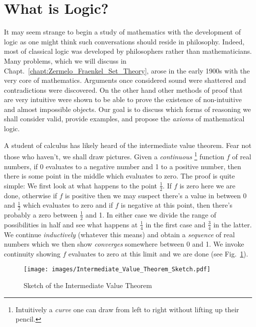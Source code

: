 \section{What is Logic?}
    It may seem strange to begin a study of mathematics with the development of
    logic as one might think such conversations should reside in philosophy.
    Indeed, most of classical logic was developed by philosophers rather than
    mathematicians. Many problems, which we will discuss in
    Chapt.~\ref{chapt:Zermelo_Fraenkel_Set_Theory}, arose in the early 1900s
    with the very core of mathematics. Arguments once considered sound were
    shattered and contradictions were discovered. On the other hand
    other methods of proof that are very intuitive were shown to be able to
    prove the existence of non-intuitive and almost impossible objects. Our goal
    is to discuss which forms of reasoning we shall consider valid, provide
    examples, and propose the \textit{axioms} of mathematical logic.
    \begin{example}
        \label{ex:Logic_IVP}%
        A student of calculus has likely heard of the intermediate value
        theorem. Fear not those who haven't,
        we shall draw pictures. Given a \textit{continuous}%
        \footnote{%
            Intuitively a \textit{curve} one can draw from left to right without
            lifting up their pencil.%
        }
        function $f$ of real numbers, if 0 evaluates to a negative number
        and 1 to a positive number, then there is some point in the middle which
        evaluates to zero. The proof is quite simple: We first look at what
        happens to the point $\frac{1}{2}$. If $f$ is zero here we are done,
        otherwise if $f$ is positive then we may suspect there's a value in
        between 0 and $\frac{1}{2}$ which evaluates to zero and if $f$ is
        negative at this point, then there's probably a zero between
        $\frac{1}{2}$ and 1. In either case we divide the range of possibilities
        in half and see what happens at $\frac{1}{4}$ in the first case and
        $\frac{3}{4}$ in the latter. We continue \textit{inductively} (whatever
        this means) and obtain a \textit{sequence} of real numbers which we then
        show \textit{converges} somewhere between 0 and 1. We invoke continuity
        showing $f$ evaluates to zero at this limit and we are done
        (see Fig.~\ref{fig:Sketch_of_IVP}).
    \end{example}
    \begin{figure}[H]
        \centering
        \captionsetup{type=figure}
        \if{}
            \texttt{[image: images/Intermediate\_Value\_Theorem\_Sketch.pdf]}
        \fi
        \caption{Sketch of the Intermediate Value Theorem}
        \label{fig:Sketch_of_IVP}
    \end{figure}
